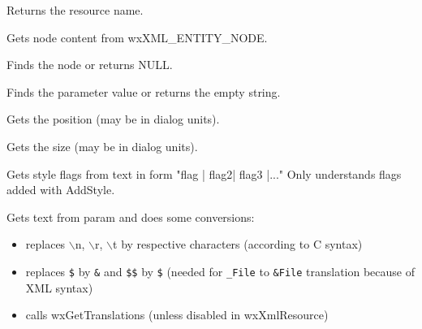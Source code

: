 
Returns the resource name.

\label{wxxmlresourcehandlergetnodecontent}


Gets node content from wxXML\_ENTITY\_NODE.

\label{wxxmlresourcehandlergetparamnode}


Finds the node or returns NULL.

\label{wxxmlresourcehandlergetparamvalue}


Finds the parameter value or returns the empty string.

\label{wxxmlresourcehandlergetposition}


Gets the position (may be in dialog units).

\label{wxxmlresourcehandlergetsize}


Gets the size (may be in dialog units).

\label{wxxmlresourcehandlergetstyle}


Gets style flags from text in form "flag | flag2| flag3 |..."
Only understands flags added with AddStyle.

\label{wxxmlresourcehandlergettext}


Gets text from param and does some conversions:

\begin{itemize}\itemsep=0pt
\item replaces $\backslash$n, $\backslash$r, $\backslash$t by respective characters (according to C syntax)
\item replaces {\tt\$} by {\tt\&} and {\tt\$\$} by {\tt\$} (needed for {\tt\_File} to {\tt\&File}
translation because of XML syntax)
\item calls wxGetTranslations (unless disabled in wxXmlResource)
\end{itemize}

